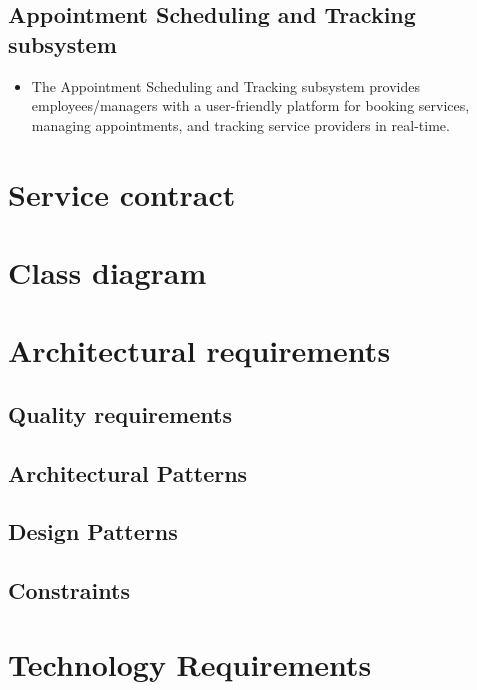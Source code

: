 \documentclass{article}
\begin{document}
	\subsection*{Appointment Scheduling and Tracking subsystem}
	\begin{itemize}
	    \item The Appointment Scheduling and Tracking subsystem provides employees/managers with a user-friendly platform for booking services, managing appointments, and tracking service providers in real-time.
	\end{itemize}

	
	\newpage
	
	\section*{Service contract}	
	
	\newpage
	
	\section*{Class diagram}
	
	\newpage
	
	\section*{Architectural requirements}
	
	\subsection*{Quality requirements}	
	\subsection*{Architectural Patterns}	
	\subsection*{Design Patterns}	
	\subsection*{Constraints}	
	
	\newpage
	\section*{Technology Requirements}
	
	
\end{document}
